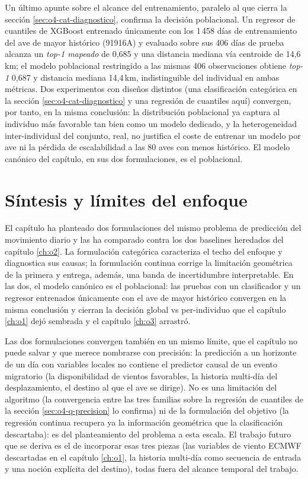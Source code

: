 Un último apunte sobre el alcance del entrenamiento, paralelo al que cierra la
sección \ref{sec:o4-cat-diagnostico}, confirma la decisión poblacional. Un regresor
de cuantiles de XGBoost entrenado únicamente con los 1\,458 días de entrenamiento
del ave de mayor histórico (91916A) y evaluado sobre sus 406 días de prueba alcanza
un \textit{top-1 mapeado} de 0,685 y una distancia mediana vía centroide de
14,6\,km; el modelo poblacional restringido a las mismas 406 observaciones obtiene
\textit{top-1} 0,687 y distancia mediana 14,4\,km, indistinguible del individual en
ambas métricas. Dos experimentos con diseños distintos (una clasificación categórica
en la sección \ref{sec:o4-cat-diagnostico} y una regresión de cuantiles aquí)
convergen, por tanto, en la misma conclusión: la distribución poblacional ya captura
al individuo más favorable tan bien como un modelo dedicado, y la heterogeneidad
inter-individual del conjunto, real, no justifica el coste de entrenar un modelo por
ave ni la pérdida de escalabilidad a las 80 aves con menos histórico. El modelo
canónico del capítulo, en sus dos formulaciones, es el poblacional.

\section{Síntesis y límites del enfoque}
\label{sec:o4-sintesis}

El capítulo ha planteado dos formulaciones del mismo problema de predicción del
movimiento diario y las ha comparado contra los dos baselines heredados del
capítulo \ref{ch:o2}. La formulación categórica caracteriza el techo del enfoque y
diagnostica sus causas; la formulación continua corrige la limitación geométrica de
la primera y entrega, además, una banda de incertidumbre interpretable. En las dos,
el modelo canónico es el poblacional: las pruebas con un clasificador y un regresor
entrenados únicamente con el ave de mayor histórico convergen en la misma
conclusión y cierran la decisión global vs per-individuo que el capítulo
\ref{ch:o1} dejó sembrada y el capítulo \ref{ch:o3} arrastró.

Las dos formulaciones convergen también en un mismo límite, que el capítulo no
puede salvar y que merece nombrarse con precisión: la predicción a un horizonte de
un día con variables locales no contiene el predictor causal de un evento
migratorio (la disponibilidad de vientos favorables, la historia multi-día del
desplazamiento, el destino al que el ave se dirige). No es una limitación del
algoritmo (la convergencia entre las tres familias sobre la regresión de cuantiles
de la sección \ref{sec:o4-q-precision} lo confirma) ni de la formulación del
objetivo (la regresión continua recupera ya la información geométrica que la
clasificación descartaba): es del planteamiento del problema a esta escala. El
trabajo futuro que se deriva es el de incorporar esas tres piezas (las variables de
viento ECMWF descartadas en el capítulo \ref{ch:o1}, la historia multi-día como
secuencia de entrada y una noción explícita del destino), todas fuera del alcance
temporal del trabajo.

